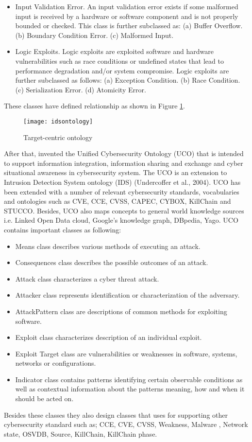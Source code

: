 \begin{itemize}
    \item Input Validation Error. An input validation error exists if some malformed input is received by a hardware or software component and is not properly bounded or checked. This class is further subclassed as: (a) Buffer Overflow. (b) Boundary Condition Error. (c) Malformed Input.
    \item Logic Exploits. Logic exploits are exploited software and hardware vulnerabilities such as race conditions or undefined states that lead to performance degradation and/or system compromise. Logic exploits are further subclassed as follows: (a) Exception Condition. (b) Race Condition. (c) Serialization Error. (d) Atomicity Error.
\end{itemize}
 These classes have defined relationship as shown in Figure \ref{fig:idsontology}.

\begin{figure}
    \centering
    \texttt{[image: idsontology]}
    \caption{Target-centric ontology}
    \label{fig:idsontology}
\end{figure}

After that, \cite{syed2016uco} invented the Unified Cybersecurity Ontology (UCO) that is intended to support information integration, information sharing and exchange and cyber situational awareness in cybersecurity system. The UCO is an extension to Intrusion Detection System ontology (IDS) (Undercoffer et al., 2004). UCO has been extended with a number of relevant cybersecurity standards, vocabularies and ontologies such as CVE, CCE, CVSS, CAPEC, CYBOX, KillChain and STUCCO. Besides, UCO also maps concepts to general world knowledge sources i.e. Linked Open Data cloud, Google’s knowledge graph, DBpedia, Yago. UCO contains important classes as following:
\begin{itemize}
    \item Means class describes various methods of executing an attack. 
    \item Consequences class describes the possible outcomes of an attack. 
    \item Attack class characterizes a cyber threat attack. 
    \item Attacker class represents identification or characterization of the adversary. 
    \item AttackPattern class are descriptions of common methods for exploiting software.  
    \item Exploit class characterizes description of an individual exploit.
    \item Exploit Target class are vulnerabilities or weaknesses in software, systems, networks or configurations.
    \item Indicator class contains patterns identifying certain observable conditions as well as contextual information about the patterns meaning, how and when it should be acted on.
\end{itemize}
Besides these classes they also design classes that uses for supporting other cybersecurity standard such as; CCE, CVE, CVSS, Weakness, Malware , Network state, OSVDB, Source, KillChain, KillChain phase.

